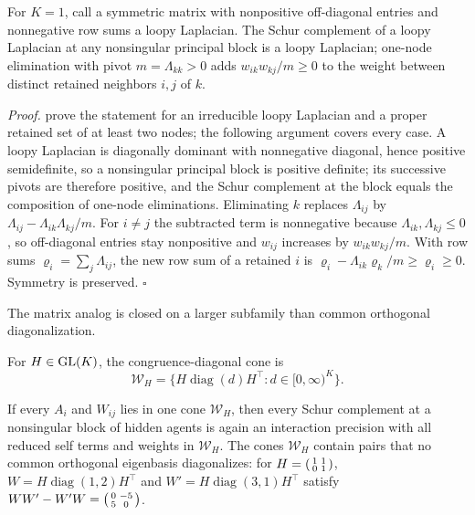 For \(K=1\), call a symmetric matrix with nonpositive off-diagonal entries and
nonnegative row sums a loopy Laplacian. The Schur complement of a loopy
Laplacian at any nonsingular principal block is a loopy Laplacian; one-node
elimination with pivot \(m=\Lambda_{kk}>0\) adds \(w_{ik}w_{kj}/m\geq0\) to the
weight between distinct retained neighbors \(i,j\) of \(k\).

\noindent\emph{Proof.}
\citet[Lemma~II.1]{DorflerBullo2013Kron} prove the statement for an irreducible
loopy Laplacian and a proper retained set of at least two nodes; the following
argument covers every case. A loopy Laplacian is diagonally dominant with
nonnegative diagonal, hence positive semidefinite, so a nonsingular principal
block is positive definite; its successive pivots are therefore positive, and
the Schur complement at the block equals the composition of one-node
eliminations. Eliminating \(k\) replaces \(\Lambda_{ij}\) by
\(\Lambda_{ij}-\Lambda_{ik}\Lambda_{kj}/m\). For \(i\neq j\) the subtracted term
is nonnegative because \(\Lambda_{ik},\Lambda_{kj}\leq0\), so off-diagonal
entries stay nonpositive and \(w_{ij}\) increases by \(w_{ik}w_{kj}/m\). With
row sums \(\varrho_i=\sum_j\Lambda_{ij}\), the new row sum of a retained \(i\) is
\(\varrho_i-\Lambda_{ik}\varrho_k/m\geq\varrho_i\geq0\). Symmetry is preserved.
\(\square\)

The matrix analog is closed on a larger subfamily than common orthogonal
diagonalization.

For \(H\in\mathrm{GL}(K)\), the congruence-diagonal cone is
\begin{equation}
\mathcal W_H
=\{H\operatorname{diag}(d)H^\top:d\in[0,\infty)^K\}.
\label{eq:cg-congruence-diagonal-cone}
\end{equation}

If every \(A_i\) and \(W_{ij}\) lies in one cone \(\mathcal W_H\), then every
Schur complement at a nonsingular block of hidden agents is again an interaction
precision with all reduced self terms and weights in \(\mathcal W_H\). The cones
\(\mathcal W_H\) contain pairs that no common orthogonal eigenbasis
diagonalizes: for \(H=\begin{psmallmatrix}1&1\\0&1\end{psmallmatrix}\),
\(W=H\operatorname{diag}(1,2)H^\top\) and \(W'=H\operatorname{diag}(3,1)H^\top\)
satisfy \(WW'-W'W=\begin{psmallmatrix}0&-5\\5&0\end{psmallmatrix}\).


